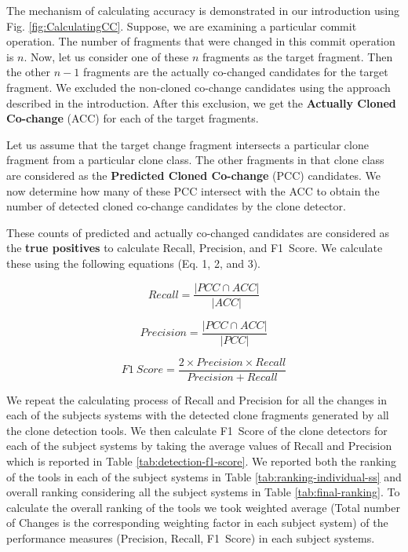 \documentclass[review]{elsarticle}
\begin{document}
The mechanism of calculating accuracy is demonstrated in our introduction using Fig. \ref{fig:CalculatingCC}. Suppose, we are examining a particular commit operation. The number of fragments that were changed in this commit operation is $n$. Now, let us consider one of these $n$ fragments as the target fragment. Then the other $n-1$ fragments are the actually co-changed candidates for the target fragment. We excluded the non-cloned co-change candidates using the approach described in the introduction. After this exclusion, we get the \textbf{Actually Cloned Co-change} (ACC) for each of the target fragments. 

Let us assume that the target change fragment intersects a particular clone fragment from a particular clone class. The other fragments in that clone class are considered as the \textbf{Predicted Cloned Co-change} (PCC) candidates. We now determine how many of these PCC intersect with the ACC to obtain the number of detected cloned co-change candidates by the clone detector. 

These counts of predicted and actually co-changed candidates are considered as the \textbf{true positives} to calculate Recall, Precision, and F1~Score. We calculate these using the following equations (Eq. 1, 2, and 3).

\begin{equation}
    Recall = \frac{|PCC \cap ACC|}{|ACC|}
\end{equation}

\begin{equation}
    Precision = \frac{|PCC \cap ACC|}{|PCC|}
\end{equation}

\begin{equation}
    F1~Score = \frac{2 \times Precision \times Recall}{Precision + Recall}
\end{equation}

\vspace{1mm}
We repeat the calculating process of Recall and Precision for all the changes in each of the subjects systems with the detected clone fragments generated by all the clone detection tools. We then calculate F1~Score of the clone detectors for each of the subject systems by taking the average values of Recall and Precision which is reported in Table \ref{tab:detection-f1-score}. We reported both the ranking of the tools in each of the subject systems in Table \ref{tab:ranking-individual-ss} and overall ranking considering all the subject systems in Table \ref{tab:final-ranking}. To calculate the overall ranking of the tools we took weighted average (Total number of Changes is the corresponding weighting factor in each subject system) of the performance measures (Precision, Recall, F1~Score) in each subject systems. 
\end{document}
